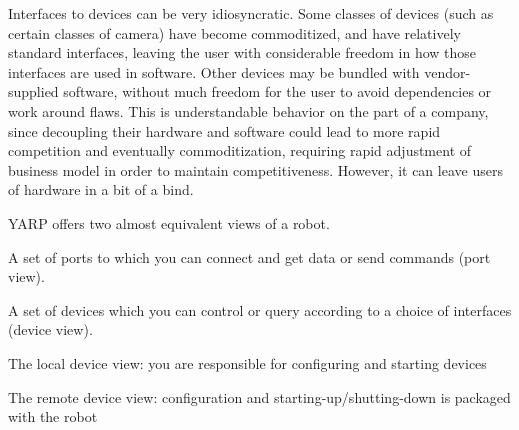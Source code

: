 Interfaces to devices can be very idiosyncratic.  Some
classes of devices (such as certain classes of camera) have become
commoditized, and have relatively standard interfaces, leaving the
user with considerable freedom in how those interfaces are used in
software.  Other devices may be bundled with vendor-supplied software,
without much freedom for the user to avoid dependencies or work around
flaws.  This is understandable behavior on the part of a company,
since decoupling their hardware and software could lead to more rapid
competition and eventually commoditization, requiring rapid adjustment
of business model in order to maintain competitiveness.  However,
it can leave users of hardware in a bit of a bind.


YARP offers two almost equivalent views of a robot.


A set of ports to which you can connect and get data or send commands
(port view).

A set of devices which you can control or query according to a choice
of interfaces (device view).

The local device view: you are responsible for configuring and starting devices

The remote device view: configuration and starting-up/shutting-down is
packaged with the robot

